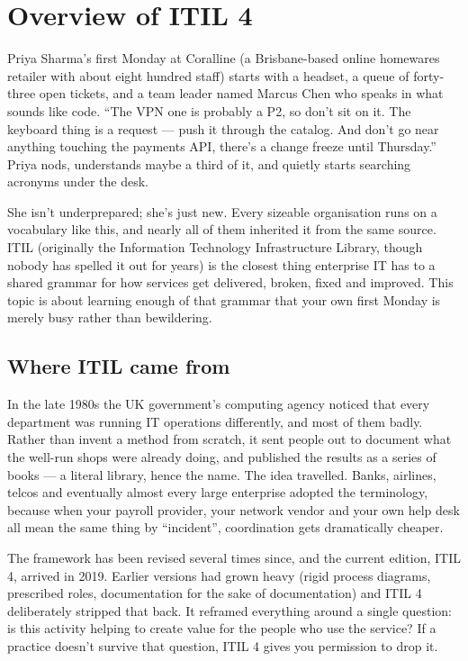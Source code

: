 \section{Overview of ITIL 4}
Priya Sharma's first Monday at Coralline (a Brisbane-based online homewares retailer with about eight hundred staff) starts with a headset, a queue of forty-three open tickets, and a team leader named Marcus Chen who speaks in what sounds like code. ``The VPN one is probably a P2, so don't sit on it. The keyboard thing is a request — push it through the catalog. And don't go near anything touching the payments API, there's a change freeze until Thursday.'' Priya nods, understands maybe a third of it, and quietly starts searching acronyms under the desk.


She isn't underprepared; she's just new. Every sizeable organisation runs on a vocabulary like this, and nearly all of them inherited it from the same source. ITIL (originally the Information Technology Infrastructure Library, though nobody has spelled it out for years) is the closest thing enterprise IT has to a shared grammar for how services get delivered, broken, fixed and improved. This topic is about learning enough of that grammar that your own first Monday is merely busy rather than bewildering.



\subsection{Where ITIL came from}


In the late 1980s the UK government's computing agency noticed that every department was running IT operations differently, and most of them badly. Rather than invent a method from scratch, it sent people out to document what the well-run shops were already doing, and published the results as a series of books — a literal library, hence the name. The idea travelled. Banks, airlines, telcos and eventually almost every large enterprise adopted the terminology, because when your payroll provider, your network vendor and your own help desk all mean the same thing by ``incident'', coordination gets dramatically cheaper.


The framework has been revised several times since, and the current edition, ITIL 4, arrived in 2019. Earlier versions had grown heavy (rigid process diagrams, prescribed roles, documentation for the sake of documentation) and ITIL 4 deliberately stripped that back. It reframed everything around a single question: is this activity helping to create value for the people who use the service? If a practice doesn't survive that question, ITIL 4 gives you permission to drop it.



